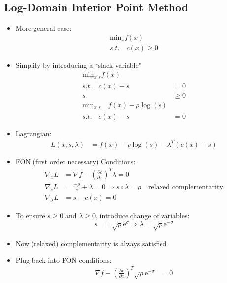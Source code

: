 \documentclass[11pt]{article}
\begin{document}
\subsection{Log-Domain Interior Point Method}
\begin{itemize}
    \item More general case:
    \begin{align*}
        \text{min}_x f(x) 
        \\
        s.t. \quad c(x) \geq0
    \end{align*}
    \item Simplify by introducing a ``slack variable"
    \begin{align*}
        \text{min}_{x,s} f(x)
        \\
        s.t. \quad c(x) - s &= 0
        \\
        s&\geq0
        \\
        \text{min}_{x,s} \quad f(x) - \rho\log(s)
        \\
        s.t. \quad c(x)-s &= 0
    \end{align*}
    \item Lagrangian:
    \begin{align*}
        L(x,s,\lambda) &= f(x) - \rho \log(s) - \lambda^T(c(x)-s)
    \end{align*}
    \item FON (first order necessary) Conditions:
    \begin{align*}
        \nabla_xL &= \nabla f - \left(\frac{\partial c}{\partial x}\right)^T\lambda =0
        \\
        \nabla_sL &= \frac{-\rho}{s} + \lambda = 0 \Rightarrow s\circ \lambda = \rho \quad \text{relaxed complementarity}
        \\
        \nabla_\lambda L &= s- c(x) = 0
    \end{align*}
    \item To ensure $s\geq0$ and $\lambda\geq 0$, introduce change of variables:
    \begin{align*}
        s &= \sqrt{\rho}\text{e}^\sigma \Rightarrow \lambda = \sqrt{\rho}\text{e}^{-\sigma}
    \end{align*}
    \item Now (relaxed) complementarity is always satisfied
    \item Plug back into FON conditions:
    \begin{align*}
        \nabla f - \left(\frac{\partial c}{\partial x}\right)^T\sqrt{\rho}\text{e}^{-\sigma} &= 0
        \\

\end{align*}
\end{itemize}
\end{document}
